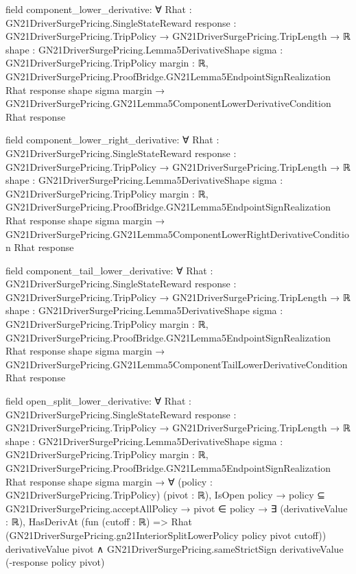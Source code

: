 \documentclass[10pt]{article}
\begin{document}
\begin{ReviewVerbatim}
field component_lower_derivative:
∀ {Rhat : GN21DriverSurgePricing.SingleStateReward}
  {response : GN21DriverSurgePricing.TripPolicy → GN21DriverSurgePricing.TripLength → ℝ}
  {shape : GN21DriverSurgePricing.Lemma5DerivativeShape} {sigma : GN21DriverSurgePricing.TripPolicy} {margin : ℝ},
  GN21DriverSurgePricing.ProofBridge.GN21Lemma5EndpointSignRealization Rhat response shape sigma margin →
    GN21DriverSurgePricing.GN21Lemma5ComponentLowerDerivativeCondition Rhat response

field component_lower_right_derivative:
∀ {Rhat : GN21DriverSurgePricing.SingleStateReward}
  {response : GN21DriverSurgePricing.TripPolicy → GN21DriverSurgePricing.TripLength → ℝ}
  {shape : GN21DriverSurgePricing.Lemma5DerivativeShape} {sigma : GN21DriverSurgePricing.TripPolicy} {margin : ℝ},
  GN21DriverSurgePricing.ProofBridge.GN21Lemma5EndpointSignRealization Rhat response shape sigma margin →
    GN21DriverSurgePricing.GN21Lemma5ComponentLowerRightDerivativeCondition Rhat response

field component_tail_lower_derivative:
∀ {Rhat : GN21DriverSurgePricing.SingleStateReward}
  {response : GN21DriverSurgePricing.TripPolicy → GN21DriverSurgePricing.TripLength → ℝ}
  {shape : GN21DriverSurgePricing.Lemma5DerivativeShape} {sigma : GN21DriverSurgePricing.TripPolicy} {margin : ℝ},
  GN21DriverSurgePricing.ProofBridge.GN21Lemma5EndpointSignRealization Rhat response shape sigma margin →
    GN21DriverSurgePricing.GN21Lemma5ComponentTailLowerDerivativeCondition Rhat response

field open_split_lower_derivative:
∀ {Rhat : GN21DriverSurgePricing.SingleStateReward}
  {response : GN21DriverSurgePricing.TripPolicy → GN21DriverSurgePricing.TripLength → ℝ}
  {shape : GN21DriverSurgePricing.Lemma5DerivativeShape} {sigma : GN21DriverSurgePricing.TripPolicy} {margin : ℝ},
  GN21DriverSurgePricing.ProofBridge.GN21Lemma5EndpointSignRealization Rhat response shape sigma margin →
    ∀ (policy : GN21DriverSurgePricing.TripPolicy) (pivot : ℝ),
      IsOpen policy →
        policy ⊆ GN21DriverSurgePricing.acceptAllPolicy →
          pivot ∈ policy →
            ∃ (derivativeValue : ℝ),
              HasDerivAt
                  (fun (cutoff : ℝ) => Rhat (GN21DriverSurgePricing.gn21InteriorSplitLowerPolicy policy pivot cutoff))
                  derivativeValue pivot ∧
                GN21DriverSurgePricing.sameStrictSign derivativeValue (-response policy pivot)
\end{ReviewVerbatim}
\end{document}
